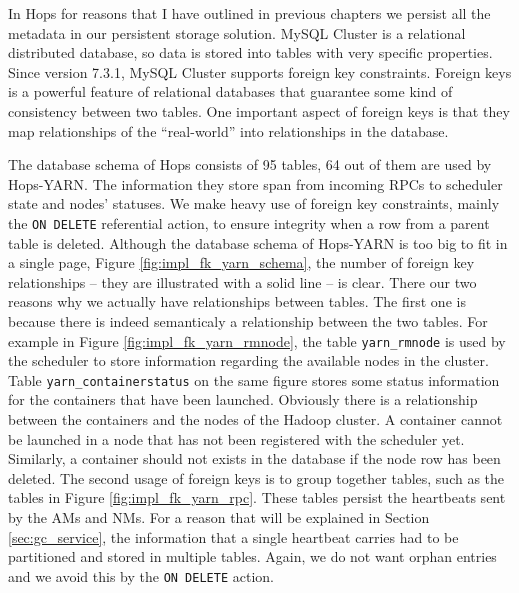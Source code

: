 In Hops for reasons that I have outlined in previous chapters we
persist all the metadata in our persistent storage solution. MySQL
Cluster is a relational distributed database, so data is stored into
tables with very specific properties. Since version 7.3.1, MySQL
Cluster supports foreign key constraints. Foreign keys is a powerful
feature of relational databases that guarantee some kind of
consistency between two tables. One important aspect of foreign keys
is that they map relationships of the ``real-world'' into
relationships in the database.

The database schema of Hops consists of 95 tables, 64 out of them are
used by Hops-YARN. The information they store span from incoming RPCs
to scheduler state and nodes' statuses. We make heavy use of foreign
key constraints, mainly the \texttt{ON DELETE} referential action, to
ensure integrity when a row from a parent table is deleted. Although
the database schema of Hops-YARN is too big to fit in
a single page, Figure \ref{fig:impl_fk_yarn_schema}, the number of
foreign key relationships -- they are illustrated with a solid line --
is clear. There our two reasons why we actually have relationships
between tables. The first one is because there is indeed semanticaly a
relationship between the two tables. For example in Figure
\ref{fig:impl_fk_yarn_rmnode}, the table \texttt{yarn\_rmnode} is used by
the scheduler to store information regarding the available nodes in
the cluster. Table \texttt{yarn\_containerstatus} on the same figure
stores some status information for the containers that have been
launched. Obviously there is a relationship between the containers and
the nodes of the Hadoop cluster. A container cannot be launched in a
node that has not been registered with the scheduler yet. Similarly,
a container should not exists in the database if the node row has been
deleted. The second usage of foreign keys is to group together tables,
such as the tables in Figure \ref{fig:impl_fk_yarn_rpc}. These tables
persist the heartbeats sent by the AMs and NMs. For a reason that will
be explained in Section \ref{sec:gc_service}, the information that a
single heartbeat carries had to be partitioned and stored in multiple
tables. Again, we do not want orphan entries and we avoid this by the
\texttt{ON DELETE} action.

